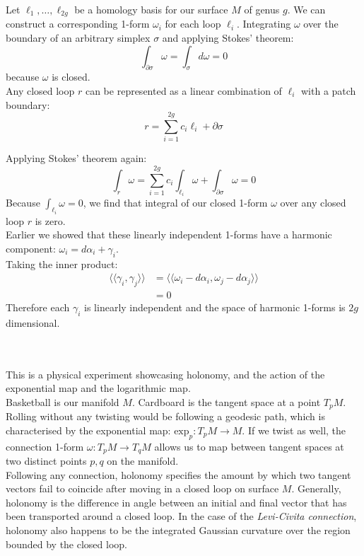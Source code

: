 \documentclass{article}
\def\ll{\langle\langle}
\def\rr{\rangle\rangle}
\begin{document}
Let $\ell_1, \dots , \ell_{2g}$ be a homology basis for our surface $M$ of genus $g$.
We can construct a corresponding 1-form $\omega_i$ for each loop $\ell_i$. Integrating $\omega$ over the boundary of 
an arbitrary simplex $\sigma$ and applying Stokes' theorem:
$$
    \int_{\partial\sigma} \omega = \int_\sigma d\omega = 0
$$
because $\omega$ is closed. \\

Any closed loop $r$ can be represented as a linear combination of $\ell_i$ with a patch boundary:
$$
    r = \sum_{i=1}^{2g} c_i \ell_i + \partial\sigma
$$

Applying Stokes' theorem again:
$$
    \int_r \omega = \sum_{i=1}^{2g} c_i \int_{\ell_i} \omega + \int_{\partial\sigma} \omega = 0
$$
Because $\int_{\ell_i} \omega = 0$, we find that integral of our closed 1-form $\omega$ over any closed loop $r$ is zero. \\

Earlier we showed that these linearly independent 1-forms have a harmonic component: $\omega_i = d\alpha_i + \gamma_i$. \\
Taking the inner product:
\begin{align*}
    \ll \gamma_i, \gamma_j \rr &= \ll \omega_i - d\alpha_i, \omega_j - d\alpha_j \rr \\
        &= 0
\end{align*}
Therefore each $\gamma_i$ is linearly independent and the space of harmonic 1-forms is $2g$ dimensional.


\vspace{1.8cm}
\\\\


This is a physical experiment showcasing holonomy, and the action of the exponential map and the logarithmic map.\\

Basketball is our manifold $M$. Cardboard is the tangent space at a point $T_pM$.
Rolling without any twisting would be following a geodesic path, which is characterised by the exponential map:
$\text{exp}_p: T_pM \to M$.
If we twist as well, the connection 1-form $\omega: T_pM \to T_qM$ allows us to map between tangent spaces
at two distinct points $p, q$ on the manifold. \\

Following any connection, holonomy specifies the amount by which two tangent vectors fail to coincide after moving 
in a closed loop on surface $M$. Generally, holonomy is the difference in angle between an initial and final vector
that has been transported around a closed loop. In the case of the \emph{Levi-Civita connection}, holonomy
also happens to be the integrated Gaussian curvature over the region bounded by the closed loop.
\end{document}
